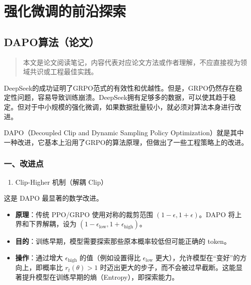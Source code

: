 \hypertarget{ux5f3aux5316ux5faeux8c03ux7684ux524dux6cbfux63a2ux7d22}{%
\chapter{强化微调的前沿探索}\label{ux5f3aux5316ux5faeux8c03ux7684ux524dux6cbfux63a2ux7d22}}

\hypertarget{dapoux7b97ux6cd5ux8bbaux6587}{%
\section{DAPO算法（论文）}\label{dapoux7b97ux6cd5ux8bbaux6587}}

\begin{quote}
本文是论文阅读笔记，内容代表对应论文方法或作者理解，不应直接视为领域共识或工程最佳实践。
\end{quote}

DeepSeek的成功证明了GRPO范式的有效性和优越性。但是，GRPO仍然存在稳定性问题，容易导致训练崩溃。DeepSeek拥有足够多的数据，可以使其趋于稳定。但对于中小规模的强化微调，如果数据批量较小，就必须对算法本身进行改进。

DAPO（Decoupled Clip and Dynamic Sampling Policy Optimization）就是其中一种改进，它基本上沿用了GRPO的算法原理，但做出了一些工程策略上的改进。

\hypertarget{ux4e00ux6539ux8fdbux70b9}{%
\subsection{一、改进点}\label{ux4e00ux6539ux8fdbux70b9}}

\begin{enumerate}
\def\labelenumi{\arabic{enumi}.}
\tightlist
\item
  Clip-Higher 机制（解耦 Clip）
\end{enumerate}

这是 DAPO 最显著的数学改进。

\begin{itemize}
\tightlist
\item
  \textbf{原理}：传统 PPO/GRPO 使用对称的裁剪范围 \((1-\epsilon, 1+\epsilon)\)。DAPO 将上界和下界解耦，设为 \((1-\epsilon_{\mathrm{low}}, 1+\epsilon_{\mathrm{high}})\)。
\item
  \textbf{目的}：训练早期，模型需要探索那些原本概率较低但可能正确的 token。
\item
  \textbf{操作}：通过增大 \(\epsilon_{\mathrm{high}}\) 的值（例如设置得比 \(\epsilon_{\mathrm{low}}\) 更大），允许模型在``变好''的方向上，即概率比 \(r_t(\theta)>1\) 时迈出更大的步子，而不会被过早截断。这能显著提升模型在训练早期的熵（Entropy），即探索能力。
\end{itemize}

